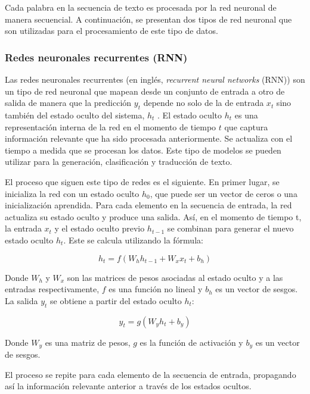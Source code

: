 \documentclass[11pt,spanish,listoffigures,listoftables]{tfgetsinf}
\begin{document}
Cada palabra en la secuencia de texto es procesada por la red neuronal de manera secuencial. A continuación, se presentan dos tipos de red neuronal que son utilizadas para el procesamiento de este tipo de datos.

\subsubsection{Redes neuronales recurrentes (RNN)}
Las redes neuronales recurrentes (en inglés, \textit{recurrent neural networks} (RNN)) son un tipo de red neuronal que mapean desde un conjunto de entrada a otro de salida de manera que la predicción $y_t$ depende no solo de la de entrada $x_t$ sino también del estado oculto del sistema, $h_t$ \cite{murphy2022probabilistic}. El estado oculto $h_t$ es una representación interna de la red en el momento de tiempo $t$ que captura información relevante que ha sido procesada anteriormente. Se actualiza con el tiempo a medida que se procesan los datos. Este tipo de modelos se pueden utilizar para la generación, clasificación y traducción de texto.

El proceso que siguen este tipo de redes es el siguiente. En primer lugar, se inicializa la red con un estado oculto $h_0$, que puede ser un vector de ceros o una inicialización aprendida. Para cada elemento en la secuencia de entrada, la red actualiza su estado oculto y produce una salida. Así, en el momento de tiempo t, la entrada $x_t$ y el estado oculto previo $h_{t-1}$ se combinan para generar el nuevo estado oculto $h_t$. Este se calcula utilizando la fórmula:

\begin{equation}
h_t = f(W_hh_{t-1} + W_xx_t + b_h)
\end{equation}

Donde $W_h$ y $W_x$ son las matrices de pesos asociadas al estado oculto y a las entradas respectivamente, $f$ es una función no lineal y $b_h$ es un vector de sesgos. La salida $y_t$ se obtiene a partir del estado oculto $h_t$:

\begin{equation}
y_t = g(W_yh_t + b_y)
\end{equation}

Donde $W_y$ es una matriz de pesos, $g$ es la función de activación y $b_y$ es un vector de sesgos.

El proceso se repite para cada elemento de la secuencia de entrada, propagando así la información relevante anterior a través de los estados ocultos.
\end{document}
